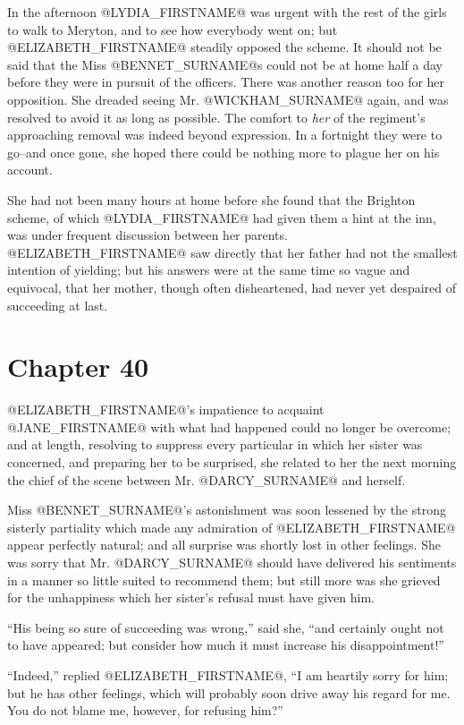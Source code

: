 In the afternoon @LYDIA_FIRSTNAME@ was urgent with the rest of the girls to walk
to Meryton, and to see how everybody went on; but @ELIZABETH_FIRSTNAME@ steadily
opposed the scheme. It should not be said that the Miss @BENNET_SURNAME@s could
not be at home half a day before they were in pursuit of the officers.
There was another reason too for her opposition. She dreaded seeing Mr.
@WICKHAM_SURNAME@ again, and was resolved to avoid it as long as possible. The
comfort to \textit{her} of the regiment's approaching removal was indeed beyond
expression. In a fortnight they were to go--and once gone, she hoped
there could be nothing more to plague her on his account.

She had not been many hours at home before she found that the Brighton
scheme, of which @LYDIA_FIRSTNAME@ had given them a hint at the inn, was under
frequent discussion between her parents. @ELIZABETH_FIRSTNAME@ saw directly that her
father had not the smallest intention of yielding; but his answers were
at the same time so vague and equivocal, that her mother, though often
disheartened, had never yet despaired of succeeding at last.



\chapter*{Chapter 40}


@ELIZABETH_FIRSTNAME@'s impatience to acquaint @JANE_FIRSTNAME@ with what had happened could
no longer be overcome; and at length, resolving to suppress every
particular in which her sister was concerned, and preparing her to be
surprised, she related to her the next morning the chief of the scene
between Mr. @DARCY_SURNAME@ and herself.

Miss @BENNET_SURNAME@'s astonishment was soon lessened by the strong sisterly
partiality which made any admiration of @ELIZABETH_FIRSTNAME@ appear perfectly
natural; and all surprise was shortly lost in other feelings. She was
sorry that Mr. @DARCY_SURNAME@ should have delivered his sentiments in a manner so
little suited to recommend them; but still more was she grieved for the
unhappiness which her sister's refusal must have given him.

``His being so sure of succeeding was wrong,'' said she, ``and certainly
ought not to have appeared; but consider how much it must increase his
disappointment!''

``Indeed,'' replied @ELIZABETH_FIRSTNAME@, ``I am heartily sorry for him; but he has
other feelings, which will probably soon drive away his regard for me.
You do not blame me, however, for refusing him?''

